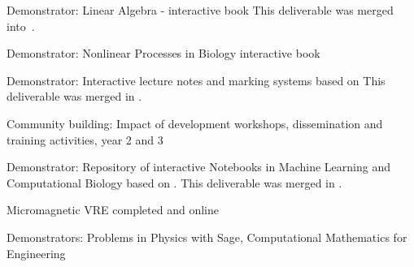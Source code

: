 \begin{workpackage}
\begin{wpdelivs}
\begin{wpdeliv}[due=24,miles=proto1,id=ibook2,dissem=PU,nature=DEM,lead=US,issue=48,status=canceled]
    {Demonstrator: Linear Algebra - interactive book}
    This deliverable was merged into~.
  \end{wpdeliv}
  \begin{wpdeliv}[due=36,id=ibook1,miles=community,dissem=PU,nature=DEM,lead=US,issue=49]
    {Demonstrator: Nonlinear Processes in Biology  interactive book}
  \end{wpdeliv}
  \begin{wpdeliv}[due=36,id=lecture-notes,miles=community,dissem=PU,nature=DEM,lead=USH,issue=35,status=canceled]
    {Demonstrator: Interactive lecture notes and marking systems based on \TheProject}
    This deliverable was merged in .
  \end{wpdeliv}
  \begin{wpdeliv}[due=36,id=workshops-3,dissem=PU,miles=community,nature=R,lead=PS,issue=36]
    {Community building: Impact of development workshops, dissemination and training activities, year 2 and 3}
  \end{wpdeliv}
  \begin{wpdeliv}[due=44,miles=eval,id=notebook-repo,dissem=PU,nature=DEM,lead=USH,issue=37,status=canceled]
    {Demonstrator: Repository of interactive Notebooks in Machine Learning and Computational Biology based on \TheProject.}
    This deliverable was merged in .
  \end{wpdeliv}
  \begin{wpdeliv}[due=48,miles=eval,id=oommfnb-vre-deliver,dissem=PU,nature=OTHER,lead=XFEL,issue=38]{Micromagnetic VRE completed and online} \end{wpdeliv}
  \begin{wpdeliv}[due=47,miles=eval,id=ibook3c,dissem=PU,nature=DEM,lead=US,issue=39]{Demonstrators: Problems in Physics with Sage, Computational Mathematics for Engineering}
  \end{wpdeliv}


\end{wpdelivs}
\end{workpackage}
